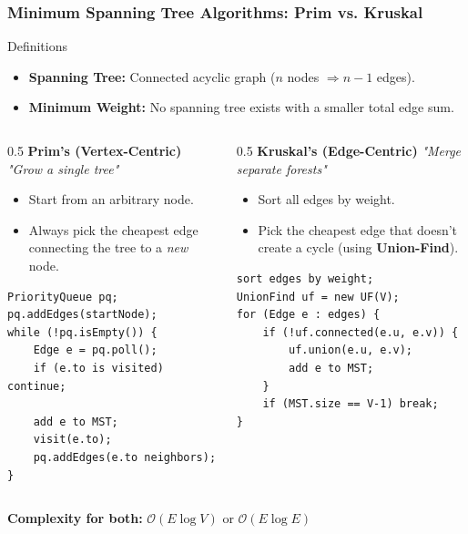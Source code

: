 \documentclass[8pt,aspectratio=169]{beamer}
\begin{document}
\begin{frame}[t, fragile]
\frametitle{Minimum Spanning Tree Algorithms: Prim vs. Kruskal}
\begin{block}{Definitions}
    \begin{itemize}
        \item \textbf{Spanning Tree:} Connected acyclic graph ($n$ nodes $\Rightarrow n-1$ edges).
        \item \textbf{Minimum Weight:} No spanning tree exists with a smaller total edge sum.
    \end{itemize}
\end{block}
\begin{columns}[T]
    \begin{column}{0.5\textwidth}
        \textbf{Prim's (Vertex-Centric)}
        \textit{"Grow a single tree"}
        \begin{itemize}
            \item Start from an arbitrary node.
            \item Always pick the cheapest edge connecting the tree to a \textit{new} node.
        \end{itemize}
        \begin{lstlisting}[basicstyle=\tiny\ttfamily, frame=single, title=Prim(G)]
PriorityQueue pq;
pq.addEdges(startNode);
while (!pq.isEmpty()) {
    Edge e = pq.poll();
    if (e.to is visited) continue;
    
    add e to MST;
    visit(e.to);
    pq.addEdges(e.to neighbors);
}
        \end{lstlisting}
    \end{column}

    \begin{column}{0.5\textwidth}
        \textbf{Kruskal's (Edge-Centric)}
        \textit{"Merge separate forests"}
        \begin{itemize}
            \item Sort all edges by weight.
            \item Pick the cheapest edge that doesn't create a cycle (using \textbf{Union-Find}).
        \end{itemize}
        \begin{lstlisting}[basicstyle=\tiny\ttfamily, frame=single, title=Kruskal(G)]
sort edges by weight;
UnionFind uf = new UF(V);
for (Edge e : edges) {
    if (!uf.connected(e.u, e.v)) {
        uf.union(e.u, e.v);
        add e to MST;
    }
    if (MST.size == V-1) break;
}
        \end{lstlisting}
    \end{column}
\end{columns}

\vspace{0.2cm}
\centering
\textbf{Complexity for both:} $\mathcal{O}(E \log V)$ or $\mathcal{O}(E \log E)$
\end{frame}
\end{document}
